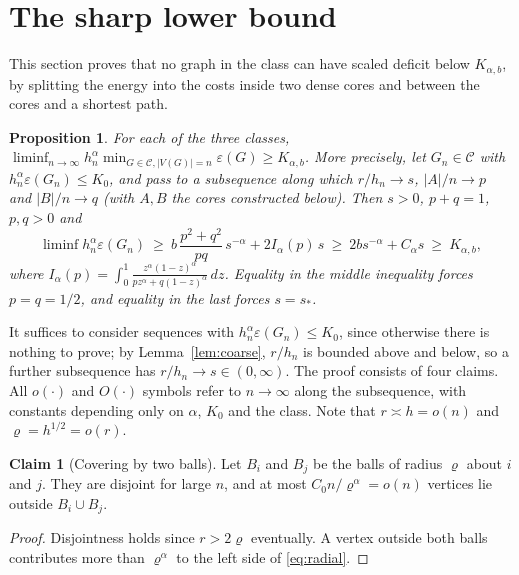 \documentclass[11pt,a4paper]{article}
\newtheorem{proposition}[theorem]{Proposition}
\theoremstyle{definition}
\newtheorem{claim}{Claim}
\newcommand{\eps}{\varepsilon}
\begin{document}
\section{The sharp lower bound}\label{sec:lower}
This section proves that no graph in the class can have scaled deficit below $K_{\alpha,b}$, by splitting the energy into the costs inside two dense cores and between the cores and a shortest path.

\begin{proposition}\label{prop:lower}
For each of the three classes, $\liminf_{n\to\infty}h_n^\alpha\min_{G\in\mathcal C,|V(G)|=n}\eps(G)\ge K_{\alpha,b}$. More precisely, let $G_n\in\mathcal C$ with $h_n^\alpha\eps(G_n)\le K_0$, and pass to a subsequence along which $r/h_n\to s$, $|A|/n\to p$ and $|B|/n\to q$ (with $A,B$ the cores constructed below). Then $s>0$, $p+q=1$, $p,q>0$ and
\begin{equation}\label{eq:key}
 \liminf h_n^\alpha\eps(G_n)\ \ge\ b\,\frac{p^2+q^2}{pq}\,s^{-\alpha}+2I_\alpha(p)\,s
 \ \ge\ 2b s^{-\alpha}+C_\alpha s\ \ge\ K_{\alpha,b},
\end{equation}
where $I_\alpha(p)=\int_0^1\frac{z^\alpha(1-z)^\alpha}{pz^\alpha+q(1-z)^\alpha}\,dz$. Equality in the middle inequality forces $p=q=1/2$, and equality in the last forces $s=s_*$.
\end{proposition}

It suffices to consider sequences with $h_n^\alpha\eps(G_n)\le K_0$, since otherwise there is nothing to prove; by Lemma~\ref{lem:coarse}, $r/h_n$ is bounded above and below, so a further subsequence has $r/h_n\to s\in(0,\infty)$. The proof consists of four claims. All $o(\cdot)$ and $O(\cdot)$ symbols refer to $n\to\infty$ along the subsequence, with constants depending only on $\alpha$, $K_0$ and the class. Note that $r\asymp h=o(n)$ and $\varrho=h^{1/2}=o(r)$.

\begin{claim}[Covering by two balls]\label{cl:cover}
Let $B_i$ and $B_j$ be the balls of radius $\varrho$ about $i$ and $j$. They are disjoint for large $n$, and at most $C_0n/\varrho^\alpha=o(n)$ vertices lie outside $B_i\cup B_j$.
\end{claim}
\begin{proof}
Disjointness holds since $r>2\varrho$ eventually. A vertex outside both balls contributes more than $\varrho^\alpha$ to the left side of \eqref{eq:radial}.
\end{proof}
\end{document}
